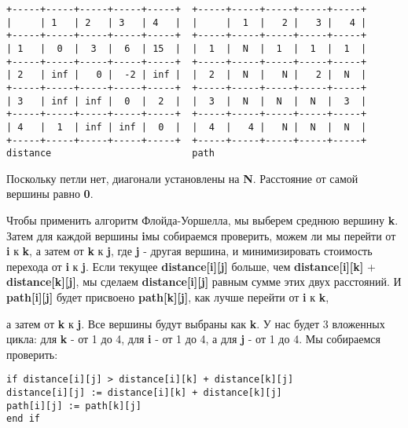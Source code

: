 \begin{tcolorbox}
\begin{verbatim}
+-----+-----+-----+-----+-----+  +-----+-----+-----+-----+-----+
|     | 1   | 2   | 3   | 4   |  |     |  1  |   2 |   3 |   4 |
+-----+-----+-----+-----+-----+  +-----+-----+-----+-----+-----+
| 1   |  0  |  3  |  6  | 15  |  |  1  |  N  |  1  |  1  |  1  |
+-----+-----+-----+-----+-----+  +-----+-----+-----+-----+-----+
| 2   | inf |   0 |  -2 | inf |  |  2  |  N  |   N |   2 |  N  |
+-----+-----+-----+-----+-----+  +-----+-----+-----+-----+-----+
| 3   | inf | inf |  0  |  2  |  |  3  |  N  |  N  |  N  |  3  |
+-----+-----+-----+-----+-----+  +-----+-----+-----+-----+-----+
| 4   |  1  | inf | inf |  0  |  |  4  |   4 |   N |  N  |  N  |
+-----+-----+-----+-----+-----+  +-----+-----+-----+-----+-----+
distance                         path

\end{verbatim}
\end{tcolorbox}

Поскольку петли нет, диагонали установлены на \textbf{N}. Расстояние от самой вершины равно \textbf{0}.

Чтобы применить алгоритм Флойда-Уоршелла, мы выберем среднюю вершину \textbf{k}. Затем для каждой вершины \textbf{i}мы собираемся проверить, можем ли мы перейти от \textbf{i} к \textbf{k}, а затем от  \textbf{k} к \textbf{j}, где \textbf{j} - другая вершина, и минимизировать стоимость перехода от \textbf{i} к \textbf{j}. Если текущее \textbf{distance[i][j]} больше, чем \textbf{distance[i][k]} + \textbf{distance[k][j]}, мы сделаем \textbf{distance[i][j]} равным сумме этих двух расстояний. И \textbf{path[i][j]} будет присвоено \textbf{path[k][j]}, как лучше перейти от \textbf{i} к \textbf{k},


\vspace{\baselineskip}
а затем от \textbf{k} к \textbf{j}. Все вершины будут выбраны как \textbf{k}. У нас будет 3 вложенных цикла: для \textbf{k} - от 1 до 4, для \textbf{i} - от 1 до 4, а для \textbf{j} - от 1 до 4. Мы собираемся проверить:

\vspace{\baselineskip}
\begin{verbatim}
if distance[i][j] > distance[i][k] + distance[k][j]
distance[i][j] := distance[i][k] + distance[k][j]
path[i][j] := path[k][j]
end if
\end{verbatim}

